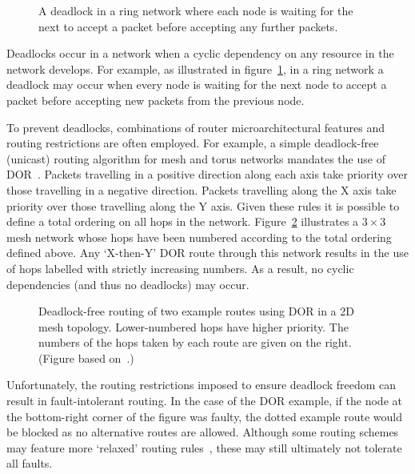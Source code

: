 			\begin{figure}
				\center
				
				\caption[A deadlock in a ring network.]%
				{A deadlock in a ring network where each node is waiting for
				the next to accept a packet before accepting any further packets.}
				\label{fig:ring-deadlock}
			\end{figure}
			
			Deadlocks occur in a network when a cyclic dependency on any resource in
			the network develops. For example, as illustrated in
			figure~\ref{fig:ring-deadlock}, in a ring network a deadlock may occur
			when every node is waiting for the next node to accept a packet before
			accepting new packets from the previous node.
			
			To prevent deadlocks, combinations of router microarchitectural features
			and routing restrictions are often employed. For example, a simple
			deadlock-free (unicast) routing algorithm for mesh and torus networks
			mandates the use of DOR~\cite[chapter~14]{dally04}. Packets travelling in
			a positive direction along each axis take priority over those travelling
			in a negative direction. Packets travelling along the X axis take
			priority over those travelling along the Y axis. Given these rules
			it is possible to define a total ordering on all hops in the network.
			Figure~\ref{fig:deadlock-free-dor} illustrates a $3\times3$ mesh network
			whose hops have been numbered according to the total ordering defined
			above.  Any `X-then-Y' DOR route through this network results in the use
			of hops labelled with strictly increasing numbers. As a result, no cyclic
			dependencies (and thus no deadlocks) may occur.
			
			\begin{figure}
				\center
			
				\caption[Deadlock-free routing using DOR in a 2D mesh topology.]%
				{Deadlock-free routing of two example routes using DOR in a 2D mesh
				topology. Lower-numbered hops have higher priority. The numbers of the
				hops taken by each route are given on the right. (Figure based
				on~\cite[figure~14.12]{dally04}.)}
				\label{fig:deadlock-free-dor}
			\end{figure}
			
			Unfortunately, the routing restrictions imposed to ensure deadlock
			freedom can result in fault-intolerant routing. In the case of the DOR
			example, if the node at the bottom-right corner of the figure was faulty,
			the dotted example route would be blocked as no alternative routes are
			allowed. Although some routing schemes may feature more `relaxed' routing
			rules~\cite{rodrigo09}, these may still ultimately not tolerate all
			faults.
			
